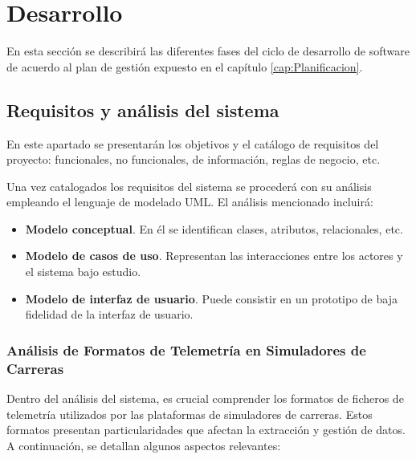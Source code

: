\chapter{Desarrollo}
\label{cap:Desarrollo}

En esta sección se describirá las diferentes fases del ciclo de desarrollo de software de acuerdo al plan de gestión expuesto en el capítulo \ref{cap:Planificacion}. 

\section{Requisitos y análisis del sistema}
En este apartado se presentarán los objetivos y el catálogo de requisitos del proyecto: funcionales, no funcionales, de información, reglas de negocio, etc.

Una vez catalogados los requisitos del sistema se procederá con su análisis empleando el lenguaje de modelado UML. El análisis mencionado incluirá:
\begin{itemize}
\item \textbf{Modelo conceptual}. En él se identifican clases, atributos, relacionales, etc.

\item \textbf{Modelo de casos de uso}. Representan las interacciones entre los actores y el sistema bajo estudio.

\item \textbf{Modelo de interfaz de usuario}. Puede consistir en un prototipo de baja fidelidad de la interfaz de usuario.
\end{itemize}

\subsection{Análisis de Formatos de Telemetría en Simuladores de Carreras}
Dentro del análisis del sistema, es crucial comprender los formatos de ficheros de telemetría utilizados por las plataformas de simuladores de carreras. Estos formatos presentan particularidades que afectan la extracción y gestión de datos. A continuación, se detallan algunos aspectos relevantes:

